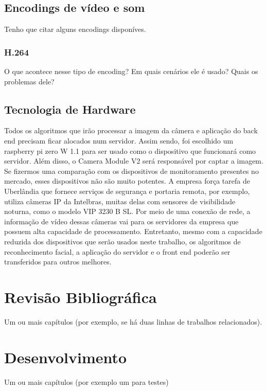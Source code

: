 \documentclass[12pt, %
openright, 
oneside, %
a4paper,    %
brazil]{facom-ufu-abntex2}
\begin{document}
\section{Encodings de vídeo e som}

Tenho que citar alguns encodings disponíves.

\subsection{H.264}

O que acontece nesse tipo de encoding? Em quais cenários ele é usado? Quais os
problemas dele?

\section{Tecnologia de Hardware}

Todos os algoritmos que irão processar a imagem da câmera e aplicação do back
end precisam ficar alocados num servidor. Assim sendo, foi escolhido um
raspberry pi zero W 1.1 para ser usado como o dispositivo que funcionará como
servidor. Além disso, o Camera Module V2 será responsável por captar a imagem.
Se fizermos uma comparação com os dispositivos de monitoramento presentes no
mercado, esses dispositivos não são muito potentes. A empresa força tarefa de
Uberlândia que fornece serviços de segurança e portaria remota, por exemplo,
utiliza câmeras IP da Intelbras, muitas delas com sensores de visibilidade
noturna, como o modelo VIP 3230 B SL. Por meio de uma conexão de rede, a
informação de vídeo dessas câmeras vai para os servidores da empresa que
possuem alta capacidade de processamento. Entretanto, mesmo com a capacidade
reduzida dos dispositivos que serão usados neste trabalho, os algoritmos de
reconhecimento facial, a aplicação do servidor e o front end poderão ser
transferidos para outros melhores.


\chapter{Revisão Bibliográfica}
Um ou mais capítulos (por exemplo, se há duas linhas de trabalhos
relacionados).

\chapter{Desenvolvimento}
Um ou mais capítulos (por exemplo um para testes)
\end{document}
